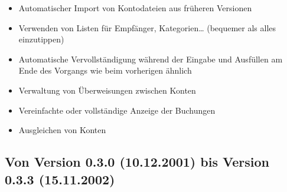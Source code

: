 \begin{itemize}
	\item Automatischer Import von Kontodateien aus früheren Versionen%
	\item Verwenden von Listen für Empfänger, Kategorien\dots{} (bequemer als alles einzutippen)%
	\item Automatische Vervollständigung während der Eingabe und Ausfüllen am Ende des Vorgangs wie beim vorherigen ähnlich%
	\item Verwaltung von Überweisungen zwischen Konten%
	\item Vereinfachte oder vollständige Anzeige der Buchungen%
	\item Ausgleichen von Konten%
\end{itemize}

\subsection{Von Version 0.3.0 \textnormal{(10.12.2001)} bis Version 0.3.3 \textnormal{(15.11.2002)}}%

